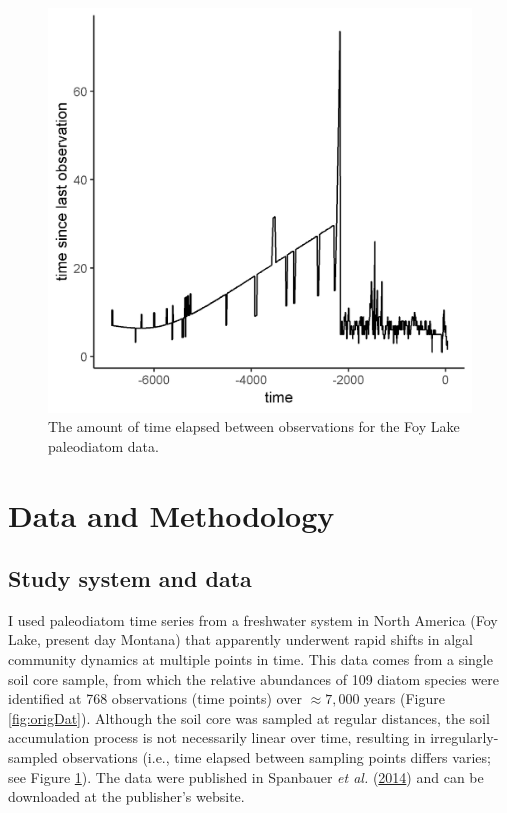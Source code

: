\documentclass[print]{nuthesis}
\begin{document}
\begin{figure}
\includegraphics[width=0.75\linewidth]{./chapterFiles/resampling/figsCalledInDiss/timeElapsed} \caption{The amount of time elapsed between observations for the Foy Lake paleodiatom data.}\label{fig:timeElapsed}
\end{figure}
\hypertarget{data-and-methodology}{%
\section{Data and Methodology}\label{data-and-methodology}}

\hypertarget{study-system-and-data}{%
\subsection{Study system and data}\label{study-system-and-data}}

I used paleodiatom time series from a freshwater system in North America (Foy Lake, present day Montana) that apparently underwent rapid shifts in algal community dynamics at multiple points in time. This data comes from a single soil core sample, from which the relative abundances of 109 diatom species were identified at 768 observations (time points) over \(\approx7,000\) years (Figure \ref{fig:origDat}). Although the soil core was sampled at regular distances, the soil accumulation process is not necessarily linear over time, resulting in irregularly-sampled observations (i.e., time elapsed between sampling points differs varies; see Figure \ref{fig:timeElapsed}). The data were published in Spanbauer \emph{et al.} (\protect\hyperlink{ref-spanbauer_prolonged_2014}{2014}) and can be downloaded at the publisher's website.
\end{document}
